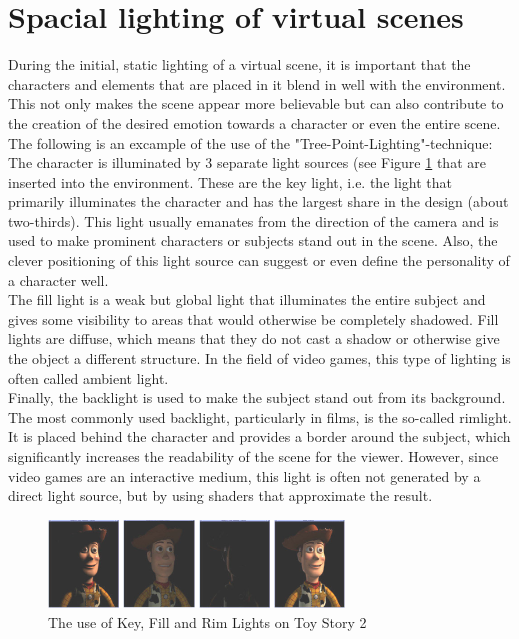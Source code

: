 \section{Spacial lighting of virtual scenes}
\label{chapter:ThreePoint}
During the initial, static lighting of a virtual scene, it is important that the characters and elements that are placed in it blend in well with the environment. This not only makes the scene appear more believable but can also contribute to the creation of the desired emotion towards a character or even the entire scene.  The following is an excample of the use of the "Tree-Point-Lighting"-technique: The character is illuminated by 3 separate light sources (see Figure \ref{fig:woody} that are inserted into the environment. These are the key light, i.e. the light that primarily illuminates the character and has the largest share in the design (about two-thirds). This light usually emanates from the direction of the camera and is used to make prominent characters or subjects stand out in the scene. Also, the clever positioning of this light source can suggest or even define the personality of a character well. \\
The fill light is a weak but global light that illuminates the entire subject and gives some visibility to areas that would otherwise be completely shadowed. Fill lights are diffuse, which means that they do not cast a shadow or otherwise give the object a different structure. In the field of video games, this type of lighting is often called ambient light. \\
Finally, the backlight is used to make the subject stand out from its background. The most commonly used backlight, particularly in films, is the so-called rimlight. It is placed behind the character and provides a border around the subject, which significantly increases the readability of the scene for the viewer. However, since video games are an interactive medium, this light is often not generated by a direct light source, but by using shaders that approximate the result. 
\begin{figure}[H]
	\centering
		\includegraphics[width=0.7\textwidth]{Bilder/pixar keyrimfill.PNG}
	\caption{The use of Key, Fill and Rim Lights on Toy Story 2 \cite{sudeep}}
	\label{fig:woody}
\end{figure}

